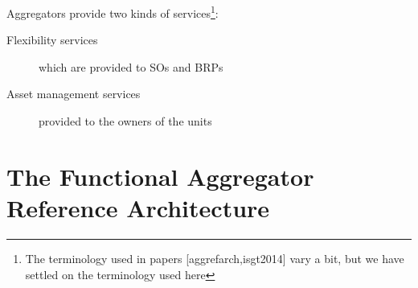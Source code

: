 Aggregators provide two kinds of services\footnote{The terminology used in papers [aggrefarch,isgt2014] vary a bit, but we have settled on the terminology used here}:
\begin{description}
	\item[Flexibility services] which are provided to SOs and BRPs
	\item[Asset management services] provided to the owners of the units
\end{description}

\section{The Functional Aggregator Reference Architecture}

